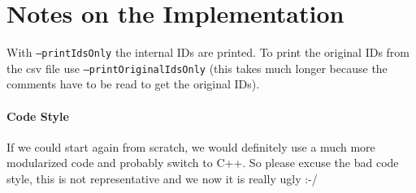 \documentclass{scrartcl}
\begin{document}
\section{Notes on the Implementation}

With \texttt{--printIdsOnly} the internal IDs are printed. To print the original IDs from the csv file use \texttt{--printOriginalIdsOnly} (this takes much longer because the comments have to be read to get the original IDs).

\paragraph{Code Style} If we could start again from scratch, we would definitely use a much more modularized code and probably switch to C++. So please excuse the bad code style, this is not representative and we now it is really ugly :-/
\end{document}
